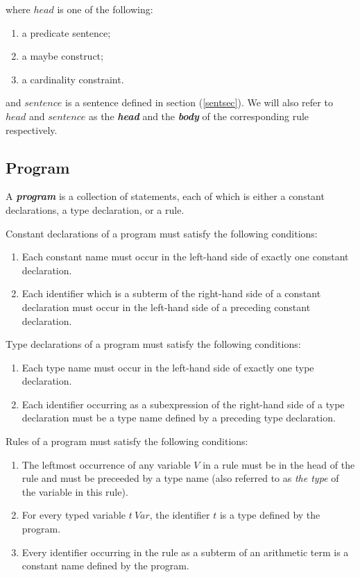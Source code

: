 \documentclass[a4paper,10pt]{article}
\begin{document}
\noindent
where $head$ is one of the following:
\begin{enumerate}
\item  a predicate sentence;
\item  a maybe construct;
\item  a cardinality constraint.
\end{enumerate}

and $sentence$ is a sentence defined in section (\ref{sentsec}).
We will also refer to $head$ and $sentence$ as the \textit{\textbf{head}} and the \textit{\textbf{body}} of the corresponding rule respectively.
 
\subsection{Program} \label{progdef}
A \textbf{\textit{program}} is a collection of statements, each of which is either a constant declarations, a
 type declaration, or a rule.

\noindent\vspace{0.2cm}

Constant declarations of a program must satisfy the following conditions:
\begin{enumerate}
\item Each constant name must occur in the left-hand side of exactly one constant declaration.
\item Each identifier which is a subterm of the right-hand side of a constant declaration must occur in the left-hand side of a preceding constant declaration.   

\end{enumerate}



Type declarations of a program must satisfy the following conditions:
\begin{enumerate}
\item Each type name must occur in the left-hand side of exactly one type declaration.
\item Each identifier occurring as  a subexpression of the right-hand side of a  type declaration must be a type name defined by a preceding type declaration. 
\end{enumerate}


Rules of a program must satisfy the following conditions:

\begin{enumerate}


\item The leftmost occurrence of any variable  $V$ in a rule must be in the head of the rule and must be preceeded by a type name (also referred to as \textit{the type} of the variable in this rule).

\item For every typed variable $t~Var$, the identifier $t$ is a type defined by the program.
\item Every identifier  occurring in the rule as a subterm of an arithmetic term is a constant name defined by the program.
\end{enumerate}
\end{document}
